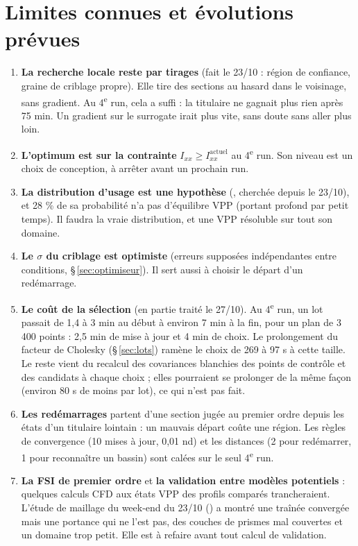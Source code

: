 \documentclass[10pt,a4paper]{article}
\begin{document}
\section{Limites connues et évolutions prévues}
\begin{enumerate}
  \item \textbf{La recherche locale reste par tirages} (fait le 23/10 : région de confiance, graine de
        criblage propre). Elle tire des sections au hasard dans le voisinage, sans gradient. Au
        4\textsuperscript{e} run, cela a suffi : la titulaire ne gagnait plus rien après 75 min. Un gradient
        sur le surrogate irait plus vite, sans doute sans aller plus loin.
  \item \textbf{L'optimum est sur la contrainte} $I_{xx}\ge I_{xx}^{\text{actuel}}$ au 4\textsuperscript{e}
        run. Son niveau est un choix de conception, à arrêter avant un prochain run.
  \item \textbf{La distribution d'usage est une hypothèse} (, cherchée depuis le 23/10), et
        28 \% de sa probabilité n'a pas d'équilibre VPP (portant profond par petit temps). Il faudra la
        vraie distribution, et une VPP résoluble sur tout son domaine.
  \item \textbf{Le $\sigma$ du criblage est optimiste} (erreurs supposées indépendantes entre conditions,
        §\,\ref{sec:optimiseur}). Il sert aussi à choisir le départ d'un redémarrage.
  \item \textbf{Le coût de la sélection} (en partie traité le 27/10). Au 4\textsuperscript{e} run, un lot
        passait de 1,4 à 3 min au début à environ 7 min à la fin, pour un plan de 3\,400 points : 2,5 min de
        mise à jour et 4 min de choix. Le prolongement du facteur de Cholesky (§\,\ref{sec:lots}) ramène le
        choix de 269 à 97 s à cette taille. Le reste vient du recalcul des covariances blanchies des points de
        contrôle et des candidats à chaque choix ; elles pourraient se prolonger de la même façon (environ
        80 s de moins par lot), ce qui n'est pas fait.
  \item \textbf{Les redémarrages} partent d'une section jugée au premier ordre depuis les états d'un titulaire
        lointain : un mauvais départ coûte une région. Les règles de convergence (10 mises à jour, 0,01 nd) et
        les distances (2 pour redémarrer, 1 pour reconnaître un bassin) sont calées sur le seul
        4\textsuperscript{e} run.
  \item \textbf{La FSI de premier ordre} et \textbf{la validation entre modèles potentiels} : quelques calculs
        CFD aux états VPP des profils comparés trancheraient. L'étude de maillage du week-end du 23/10
        () a montré une traînée convergée mais une portance qui ne
        l'est pas, des couches de prismes mal couvertes et un domaine trop petit. Elle est à refaire avant
        tout calcul de validation.
\end{enumerate}
\end{document}
